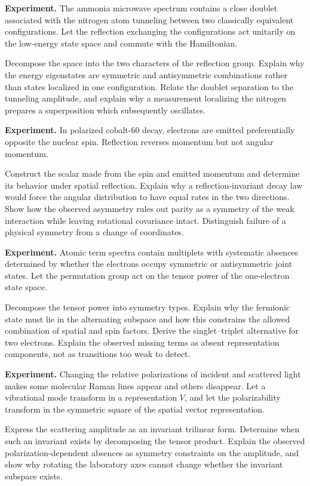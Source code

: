 \begin{exercise}
\textbf{Experiment.}
The ammonia microwave spectrum contains a close doublet associated with the
nitrogen atom tunneling between two classically equivalent configurations.
Let the reflection exchanging the configurations act unitarily on the
low-energy state space and commute with the Hamiltonian.

Decompose the space into the two characters of the reflection group.  Explain
why the energy eigenstates are symmetric and antisymmetric combinations rather
than states localized in one configuration.  Relate the doublet separation to
the tunneling amplitude, and explain why a measurement localizing the nitrogen
prepares a superposition which subsequently oscillates.
\end{exercise}

\begin{exercise}
\textbf{Experiment.}
In polarized cobalt-60 decay, electrons are emitted preferentially opposite
the nuclear spin.  Reflection reverses momentum but not angular momentum.

Construct the scalar made from the spin and emitted momentum and determine
its behavior under spatial reflection.  Explain why a reflection-invariant
decay law would force the angular distribution to have equal rates in the two
directions.  Show how the observed asymmetry rules out parity as a symmetry of
the weak interaction while leaving rotational covariance intact.  Distinguish
failure of a physical symmetry from a change of coordinates.
\end{exercise}

\begin{exercise}
\textbf{Experiment.}
Atomic term spectra contain multiplets with systematic absences determined by
whether the electrons occupy symmetric or antisymmetric joint states.
Let the permutation group act on the tensor power of the one-electron state
space.

Decompose the tensor power into symmetry types.  Explain why the fermionic
state must lie in the alternating subspace and how this constrains the allowed
combination of spatial and spin factors.  Derive the singlet--triplet
alternative for two electrons.  Explain the observed missing terms as absent
representation components, not as transitions too weak to detect.
\end{exercise}

\begin{exercise}
\textbf{Experiment.}
Changing the relative polarizations of incident and scattered light makes
some molecular Raman lines appear and others disappear.  Let a vibrational
mode transform in a representation \(V\), and let the polarizability transform
in the symmetric square of the spatial vector representation.

Express the scattering amplitude as an invariant trilinear form.  Determine
when such an invariant exists by decomposing the tensor product.  Explain the
observed polarization-dependent absences as symmetry constraints on the
amplitude, and show why rotating the laboratory axes cannot change whether
the invariant subspace exists.
\end{exercise}
